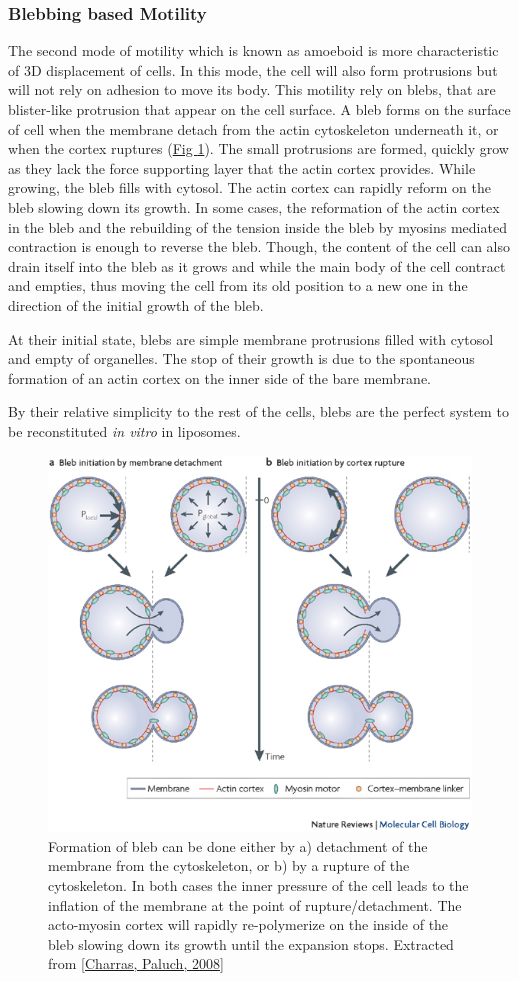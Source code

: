 \documentclass[A4paperpaper,11pt,english]{sphinxmanual}
\begin{document}
\subsubsection{Blebbing based Motility}
\label{index-latex:blebbing-based-motility}
The second mode of motility which is known as amoeboid is more characteristic
of 3D displacement of cells. In this mode, the cell will also form protrusions
but will not rely on adhesion to move its body. This motility rely on blebs,
that are blister-like protrusion that appear on the cell surface. A bleb
forms on the surface of cell when the membrane detach from the actin
cytoskeleton underneath it, or when the cortex ruptures (\hyperref[index-latex:fig-bleb]{Fig  \ref*{index-latex:fig-bleb}}). The small protrusions
are formed, quickly grow as they lack the force supporting layer that the actin
cortex provides. While growing, the bleb fills with cytosol. The actin
cortex can rapidly reform on the bleb slowing down its growth. In some cases,
the reformation of the actin cortex in the bleb and the rebuilding of the
tension inside the bleb by myosins mediated contraction is enough to reverse
the bleb. Though, the content of the cell can also drain itself into the bleb
as it grows and while the main body of the cell contract and empties, thus
moving the cell from its old position to a new one in the direction of the
initial growth of the bleb.

At their initial state, blebs are simple membrane protrusions filled with
cytosol and empty of organelles. The stop of their growth is due to the
spontaneous formation of an actin cortex on the inner side of the bare
membrane.

By their relative simplicity to the rest of the cells, blebs are the perfect
system to be reconstituted \emph{in vitro} in liposomes.
\begin{figure}[htbp]
\centering
\capstart

\includegraphics[width=0.400\linewidth]{Bleb-nature-paluch.jpg}
\caption{Formation of bleb can be done either by a) detachment of the membrane from
the cytoskeleton, or b) by a rupture of the cytoskeleton. In both cases the
inner pressure of the cell leads to the inflation of the membrane at the
point of rupture/detachment. The acto-myosin cortex will rapidly re-polymerize on
the inside of the bleb slowing down its growth until the expansion stops.
Extracted from {\hyperref[index-latex:charras2008]{{[}Charras, Paluch,  2008{]}}}}\label{index-latex:fig-bleb}\end{figure}
\end{document}
